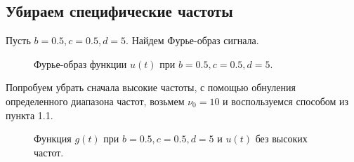 \documentclass[a5paper, 10pt]{article}
\theoremstyle{definition}
\theoremstyle{plain}
\theoremstyle{remark}
\begin{document}
\subsection{Убираем специфические частоты}

Пусть $b = 0.5, c = 0.5, d = 5$. Найдем Фурье-образ сигнала.

\begin{figure}[h!]
\caption{Фурье-образ функции $u(t)$ при $b = 0.5, c = 0.5, d = 5$.}
\end{figure}

\newpage
Попробуем убрать сначала высокие частоты, с помощью обнуления определенного диапазона частот, возьмем $\nu_0 = 10$ и воспользуемся способом из пункта 1.1.


\begin{figure}[h!]
\caption{Функция $g(t)$ при $b = 0.5, c = 0.5, d = 5$  и $u(t)$ без высоких частот.}
\end{figure}
\end{document}
